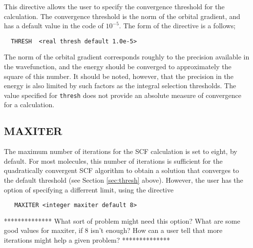 
This directive allows the user to specify the convergence threshold for the
calculation.  The convergence threshold is the norm of the orbital gradient,
and has a default value in the code of $10^{-5}$.  The form of the directive
is a follows;

\begin{verbatim}
  THRESH  <real thresh default 1.0e-5>
\end{verbatim}

The norm of the orbital gradient corresponds
roughly to the precision available in the wavefunction, and the energy
should be converged to approximately the square of this number.  It should
be noted, however, that
the precision in the energy is also limited by such factors as 
the integral selection thresholds.  The value specified for \verb+thresh+
does not provide an absolute measure of convergence for a calculation. 


\subsection{MAXITER}
\label{sec:max}


The maximum number of iterations for the SCF calculation is set to eight, by
default.  For most molecules, this number of iterations is sufficient for
the quadratically convergent SCF algorithm to obtain a
solution that converges to the default threshold (see Section  
\ref{sec:thresh} above).  However, the user has the option of specifying
a differrent limit, using the directive

\begin{verbatim}
   MAXITER <integer maxiter default 8>
\end{verbatim}

\Large
**************
What sort of problem might need this option?  What are some
good values for maxiter, if 8 isn't enough?
How can a user tell that more iterations might help a given problem?
**************
\normalsize

